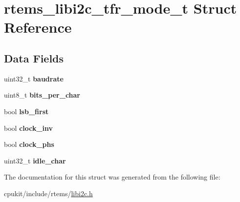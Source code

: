 \hypertarget{structrtems__libi2c__tfr__mode__t}{}\section{rtems\+\_\+libi2c\+\_\+tfr\+\_\+mode\+\_\+t Struct Reference}
\label{structrtems__libi2c__tfr__mode__t}
\subsection*{Data Fields}
\begin{DoxyCompactItemize}
\item 
\mbox{\label{structrtems__libi2c__tfr__mode__t_a8c6215fd370333b4518d4051bfad875a}} 
uint32\+\_\+t {\bfseries baudrate}
\item 
\mbox{\label{structrtems__libi2c__tfr__mode__t_ad64c51ce330a138d97074da51e5a85de}} 
uint8\+\_\+t {\bfseries bits\+\_\+per\+\_\+char}
\item 
\mbox{\label{structrtems__libi2c__tfr__mode__t_a451eb171fdb095d37705f93a4c4bd7b3}} 
bool {\bfseries lsb\+\_\+first}
\item 
\mbox{\label{structrtems__libi2c__tfr__mode__t_aa2cefd00b9c8067e6ce26957b065c145}} 
bool {\bfseries clock\+\_\+inv}
\item 
\mbox{\label{structrtems__libi2c__tfr__mode__t_af4c5354a303af91f44eff621f7e56d3d}} 
bool {\bfseries clock\+\_\+phs}
\item 
\mbox{\label{structrtems__libi2c__tfr__mode__t_a9c8406ee6d6a63f655bd66f63679c63c}} 
uint32\+\_\+t {\bfseries idle\+\_\+char}
\end{DoxyCompactItemize}


The documentation for this struct was generated from the following file\+:\begin{DoxyCompactItemize}
\item 
cpukit/include/rtems/\mbox{\hyperlink{libi2c_8h}{libi2c.\+h}}\end{DoxyCompactItemize}
